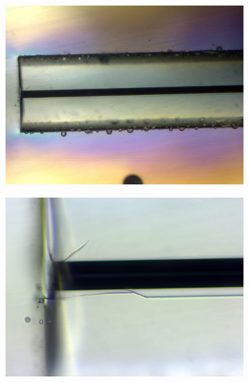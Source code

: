 \begin{figure}[h]
\centering
\begin{subfigure}{.7\textwidth}
  \centering
  \includegraphics[width=\linewidth]{fig/polishing/parallelcrack.jpg}
  \label{fig:sfig1}
\end{subfigure}%

\begin{subfigure}{.7\textwidth}
  \centering
  \includegraphics[width=\linewidth]{fig/polishing/parallelcrack2.jpg}
  \label{fig:sfig2}
\end{subfigure}%


 \caption{}
\label{fig:si_sige}
\end{figure}
\FloatBarrier
